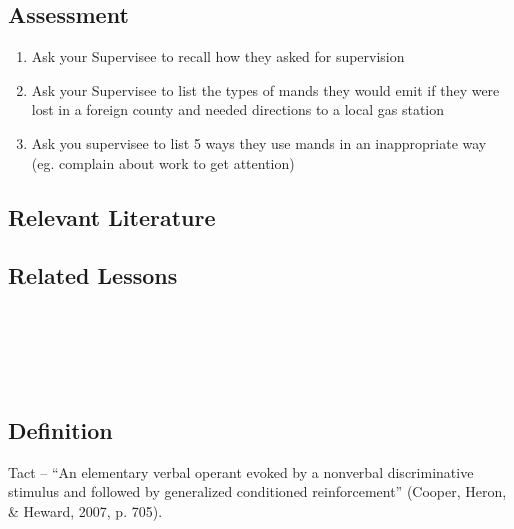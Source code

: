 \subsection{Assessment}
\begin{enumerate}
\item Ask your Supervisee to recall how they asked for supervision
\item Ask your Supervisee to list the types of mands they would emit if they were lost in a foreign county and needed directions to a local gas station
\item Ask you supervisee to list 5 ways they use mands in an inappropriate way (eg. complain about work to get attention)
%
\end{enumerate}
%
\subsection{Relevant Literature}
\begin{refsection}
\nocite{cooper2007applied,
        laraway2003motivating,
        michael1988establishing,
        sundberg2001benefits,
        sweeney2007transferring}
\printbibliography[heading=none]
\end{refsection}
%
\subsection{Related Lessons}
\fourdNine{}\\
\fourdEleven{}\\
\fourFKTwentySeven{}\\
\fourFKTwentyEight{}\\
%
\subsection{Definition}
Tact – ``An elementary verbal operant evoked by a nonverbal discriminative stimulus and followed by generalized conditioned reinforcement'' (Cooper, Heron, \& Heward, 2007, p. 705).
%
